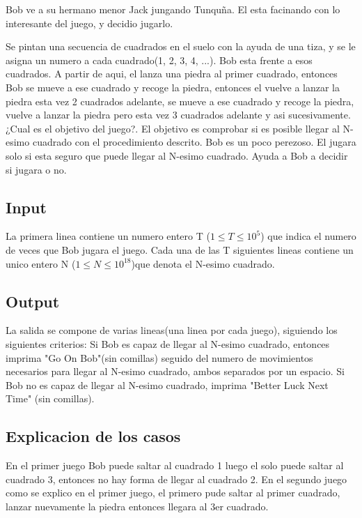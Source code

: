 
Bob ve a su hermano menor Jack jungando Tunquña. El esta facinando con lo interesante del juego, y decidio jugarlo.

Se pintan una secuencia de cuadrados en el suelo con la ayuda de una tiza, y se le asigna un numero a cada cuadrado(1, 2, 3, 4, ...). Bob esta frente a esos cuadrados. A partir de aqui, el lanza una piedra al primer cuadrado, entonces Bob se mueve a ese cuadrado y recoge la piedra, entonces el vuelve a lanzar la piedra esta vez 2 cuadrados adelante, se mueve a ese cuadrado y recoge la piedra, vuelve a lanzar la piedra pero esta vez 3 cuadrados adelante y asi sucesivamente. ¿Cual es el objetivo del juego?. El objetivo es comprobar si es posible llegar al N-esimo cuadrado con el procedimiento descrito.
Bob es un poco perezoso. El jugara solo si esta seguro que puede llegar al N-esimo cuadrado. Ayuda a Bob a decidir si jugara o no.

\subsection*{Input}

La primera linea contiene un  numero entero T ($1 \leq T \leq 10^5$) que indica el numero de veces que Bob jugara el juego. Cada una de las T siguientes lineas contiene un unico entero N ($1 \leq N \leq 10^{18}$)que denota el N-esimo cuadrado.

\subsection*{Output}

La salida se compone de varias lineas(una linea por cada juego), siguiendo los siguientes criterios: Si Bob es capaz de llegar al N-esimo cuadrado, entonces imprima "Go On Bob"(sin comillas) seguido del numero de movimientos necesarios para llegar al N-esimo cuadrado, ambos separados por un espacio. Si Bob no es capaz de llegar al N-esimo cuadrado, imprima "Better Luck Next Time" (sin comillas).

\subsection*{Explicacion de los casos}
En el primer juego Bob puede saltar al cuadrado 1 luego el solo puede saltar al cuadrado 3, entonces no hay forma de llegar al cuadrado 2.
En el segundo juego como se explico en el primer juego, el primero pude saltar al primer cuadrado, lanzar nuevamente la piedra entonces llegara al 3er cuadrado.

\datos
